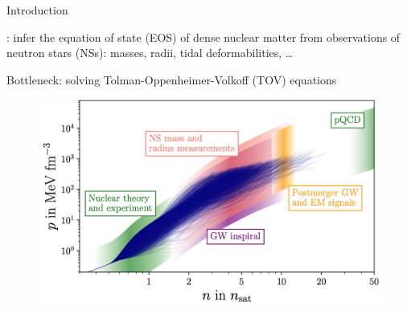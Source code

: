\documentclass[usenames,dvipsnames,t]{beamer}
\begin{document}







\begin{frame}{Introduction}
  \def\x{2mm}


  
  : infer the equation of state (EOS) of dense nuclear matter from observations of neutron stars (NSs): masses, radii, tidal deformabilities, \dots
  
  \vspace{\x}

  Bottleneck: solving Tolman-Oppenheimer-Volkoff (TOV) equations

  \vspace{\x}

  \begin{figure}
    \centering
    \includegraphics[width=0.75\linewidth]{Figures/Koehn_EOS.jpg}
  \end{figure}

\end{frame}
\end{document}
